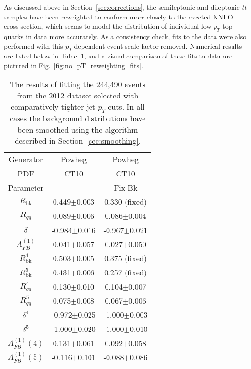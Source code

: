 \documentclass{cmspaperpdf}
\begin{document}
As discussed above in Section~\ref{sec:corrections}, the semileptonic and dileptonic $t\bar{t}$ samples have been reweighted to conform more closely to the exected NNLO cross section, which seems to model the distribution of individual low $p_{T}$ top-quarks in data more accurately. As a consistency check, fits to the data were also performed with this $p_{T}$ dependent event scale factor removed. Numerical results are listed below in Table~\ref{tab:no_pT_reweighting_data}, and a visual comparison of these fits to data are pictured in Fig.~\ref{fig:no_pT_reweighting_fits}.

\begin{table}[hbt]
\begin{center}
\caption{\small \label{tab:no_pT_reweighting_data} The results of fitting the 244,490 events from the 2012 dataset selected with comparatively tighter jet $p_{T}$ cuts. In all cases the background distributions have been smoothed using the algorithm described in Section~\ref{sec:smoothing}.}
\vspace{3pt}
\begin{tabular}{|c|c|c|}\hline
Generator          & Powheg           & Powheg           \\
   PDF             & CT10             & CT10             \\
Parameter          &                  & Fix Bk           \\
\hline
$R_\mathrm{bk}$    & 0.449$\pm$0.003  & 0.330 (fixed)    \\
$R_{q\bar q}$      & 0.089$\pm$0.006  & 0.086$\pm$0.004  \\
$\delta$           & -0.984$\pm$0.016 & -0.967$\pm$0.021 \\
$A^{(1)}_{FB}$     & 0.041$\pm$0.057  & 0.027$\pm$0.050  \\
\hline
$R^4_\mathrm{bk}$  & 0.503$\pm$0.005  & 0.375 (fixed)    \\
$R^5_\mathrm{bk}$  & 0.431$\pm$0.006  & 0.257 (fixed)    \\
$R^4_{q\bar q}$    & 0.130$\pm$0.010  & 0.104$\pm$0.007  \\
$R^5_{q\bar q}$    & 0.075$\pm$0.008  & 0.067$\pm$0.006  \\
$\delta^4$         & -0.972$\pm$0.025 & -1.000$\pm$0.003 \\
$\delta^5$         & -1.000$\pm$0.020 & -1.000$\pm$0.010 \\
$A^{(1)}_{FB}(4)$  & 0.131$\pm$0.061  & 0.092$\pm$0.058  \\
$A^{(1)}_{FB}(5)$  & -0.116$\pm$0.101 & -0.088$\pm$0.086 \\
\hline
\end{tabular}
\end{center}
\end{table}
\end{document}
